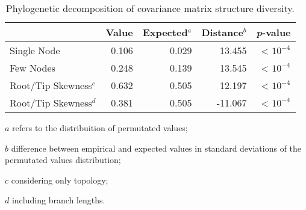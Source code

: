 \begin{table}[ht]
  \centering
  \begin{threeparttable}
  \caption{Phylogenetic decomposition of covariance matrix structure diversity. \label{tab:riem_decdiv}}
  \begin{tabular}{lrrrr}
    \toprule
    & \textbf{Value} & \textbf{Expected$^a$} & \textbf{Distance$^b$} & \textbf{\emph{p}-value} \\ 
    \midrule
    Single Node & 0.106 & 0.029 & 13.455 & < $10^{-4}$ \\ 
    Few Nodes & 0.248 & 0.139 & 13.545 & < $10^{-4}$ \\ 
    Root/Tip Skewness$^c$ & 0.632 & 0.505 & 12.197 & < $10^{-4}$ \\ 
    Root/Tip Skewness$^d$ & 0.381 & 0.505 & -11.067 & < $10^{-4}$ \\ 
    \bottomrule
  \end{tabular}
  \begin{tablenotes}
    \footnotesize
    {
    \item[$a$] refers to the distribuition of permutated values;
    \item[$b$] difference between empirical and expected values in standard deviations of the permutated values distribution;
    \item[$c$] considering only topology;
    \item[$d$] including branch lengths.
    }
  \end{tablenotes}
\end{threeparttable}
\end{table}

